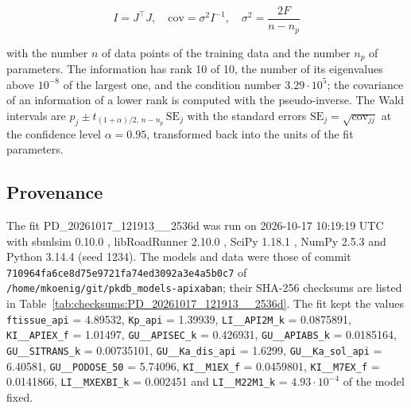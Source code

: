 \begin{equation}
I = J^\top J, \quad \mathrm{cov} = \sigma^2 I^{-1}, \quad \sigma^2 = \frac{2 F}{n - n_p}
\end{equation}

with the number $n$ of data points of the training data and the number $n_p$ of parameters. The information has rank 10 of 10, the number of its eigenvalues above $10^{-8}$ of the largest one, and the condition number $3.29 \cdot 10^{5}$; the covariance of an information of a lower rank is computed with the pseudo-inverse. The Wald intervals are $\hat{p}_j \pm t_{(1+\alpha)/2,\, n-n_p}\, \mathrm{SE}_j$ with the standard errors $\mathrm{SE}_j = \sqrt{\mathrm{cov}_{jj}}$ at the confidence level $\alpha = 0.95$, transformed back into the units of the fit parameters.

\subsection{Provenance}

The fit PD\_20261017\_121913\_\_2536d was run on 2026-10-17 10:19:19 UTC with sbmlsim 0.10.0 \cite{Koenig2026_sbmlsim}, libRoadRunner 2.10.0 \cite{Welsh2023}, SciPy 1.18.1 \cite{Virtanen2020}, NumPy 2.5.3 \cite{Harris2020} and Python 3.14.4 (seed 1234). The models and data were those of commit \texttt{710964fa6ce8d75e9721fa74ed3092a3e4a5b0c7} of \texttt{/home/mkoenig/git/pkdb\_models-apixaban}; their SHA-256 checksums are listed in Table~\ref{tab:checksums:PD_20261017_121913__2536d}. The fit kept the values \texttt{ftissue\_api} = 4.89532, \texttt{Kp\_api} = 1.39939, \texttt{LI\_\_API2M\_k} = 0.0875891, \texttt{KI\_\_APIEX\_f} = 1.01497, \texttt{GU\_\_APISEC\_k} = 0.426931, \texttt{GU\_\_APIABS\_k} = 0.0185164, \texttt{GU\_\_SITRANS\_k} = 0.00735101, \texttt{GU\_\_Ka\_dis\_api} = 1.6299, \texttt{GU\_\_Ka\_sol\_api} = 6.40581, \texttt{GU\_\_PODOSE\_50} = 5.74096, \texttt{KI\_\_M1EX\_f} = 0.0459801, \texttt{KI\_\_M7EX\_f} = 0.0141866, \texttt{LI\_\_MXEXBI\_k} = 0.002451 and \texttt{LI\_\_M22M1\_k} = $4.93 \cdot 10^{-4}$ of the model fixed.


